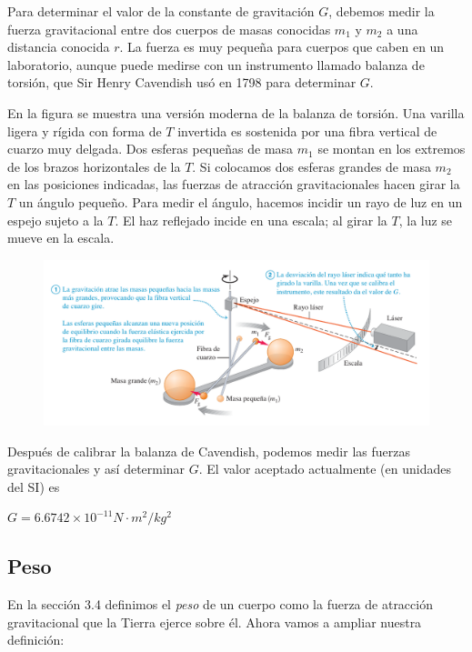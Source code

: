 \documentclass{article}
\newcommand{\newsubsection}[1]{
    \vspace{0.5cm}
    \color{sectionColor}
    \subsection{\bl{#1}}
    \color{black}
    \vspace{0.5cm}
}
\newcommand{\bl}[1]{\textbf{#1}}
\newcommand{\definicion}[1]{%
    \vspace{0.5cm}
    \begin{definicionbox}
        #1
    \end{definicionbox}
    \vspace{0.5cm}
}
\begin{document}
    \par Para determinar el valor de la constante de gravitación $G$, debemos medir la fuerza gravitacional entre dos cuerpos de masas conocidas $m_1$ y $m_2$ a una distancia conocida $r$. La fuerza es muy pequeña para cuerpos que caben en un laboratorio, aunque puede medirse con un instrumento llamado balanza de torsión, que Sir Henry Cavendish usó en 1798 para determinar $G$.
    
    \par En la ﬁgura se muestra una versión moderna de la balanza de torsión. Una varilla ligera y rígida con forma de $T$ invertida es sostenida por una ﬁbra vertical de cuarzo muy delgada. Dos esferas pequeñas de masa $m_1$ se montan en los extremos de los brazos horizontales de la $T$. Si colocamos dos esferas grandes de masa $m_2$ en las posiciones indicadas, las fuerzas de atracción gravitacionales hacen girar la $T$ un ángulo pequeño. Para medir el ángulo, hacemos incidir un rayo de luz en un espejo sujeto a la $T$. El haz reﬂejado incide en una escala; al girar la $T$, la luz se mueve en la escala.

    \begin{figure}[H]
        \centering
        \includegraphics[width=\textwidth]{img/11.1-2.png}
    \end{figure}

    \par Después de calibrar la balanza de Cavendish, podemos medir las fuerzas gravitacionales y así determinar $G$. El valor aceptado actualmente (en unidades del SI) es

    \definicion{
        \centering
        \( G = 6.6742 \times 10^{-11} N \cdot m^2 / kg^{2} \)
    }

    \newsubsection{Peso}

    \par En la sección 3.4 deﬁnimos el \textit{peso} de un cuerpo como la fuerza de atracción gravitacional que la Tierra ejerce sobre él. Ahora vamos a ampliar nuestra deﬁnición:
\end{document}

